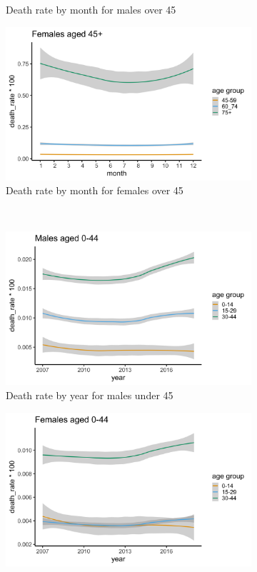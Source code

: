 \documentclass[11pt]{article}
\begin{document}
\begin{figure}
\begin{subfigure}[t]{0.49\textwidth}
\caption{Death rate by month for males over 45}
\label{fig:old_men}
\end{subfigure}
\begin{subfigure}[t]{0.49\textwidth}
\centering
\includegraphics[scale=0.076]{figs/old_women.png}
\caption{Death rate by month for females over 45}
\label{fig:old_women}
\end{subfigure}
\\
\begin{subfigure}[t]{0.49\textwidth}
\centering
\includegraphics[scale=0.076]{figs/young_men_year.png}
\caption{Death rate by year for males under 45}
\label{fig:young_men_year}
\end{subfigure}
\begin{subfigure}[t]{0.49\textwidth}
\centering
\includegraphics[scale=0.076]{figs/young_women_year.png}

\end{subfigure}
\end{figure}
\end{document}
